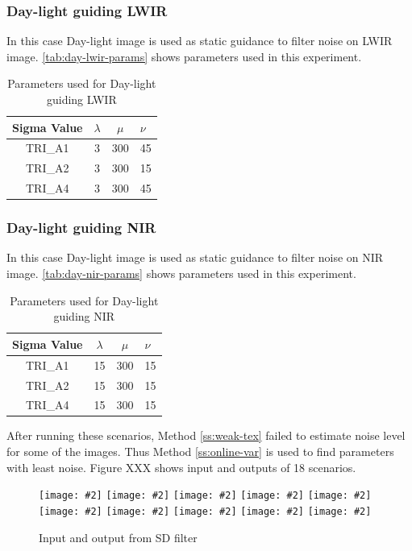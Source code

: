 \documentclass[10pt,twocolumn,letterpaper]{article}
\newcommand{\addimage}[2]{\texttt{[image: \#2]}}
\begin{document}
\subsubsection{Day-light guiding LWIR}
In this case Day-light image is used as static guidance to filter noise on LWIR image. \autoref{tab:day-lwir-params} shows parameters used in this experiment.
\begin{table}[!ht]
	\centering
	\caption{Parameters used for Day-light guiding LWIR}
	\label{tab:day-lwir-params}
	\begin{tabular}{@{}cccl@{}}
		\toprule
		\bfseries Sigma Value & \(\lambda\) & \(\mu\) & \(\nu\) \\ \midrule
		TRI\_A1               & 3        	& 300	  & 45       \\
		TRI\_A2               & 3        	& 300	  & 15       \\
		TRI\_A4               & 3        	& 300	  & 45       \\ \bottomrule
	\end{tabular}
\end{table}
\subsubsection{Day-light guiding NIR}
In this case Day-light image is used as static guidance to filter noise on NIR image. \autoref{tab:day-nir-params} shows parameters used in this experiment.
\begin{table}[!ht]
	\centering
	\caption{Parameters used for Day-light guiding NIR}
	\label{tab:day-nir-params}
	\begin{tabular}{@{}cccl@{}}
		\toprule
		\bfseries Sigma Value & \(\lambda\) & \(\mu\) & \(\nu\) \\ \midrule
		TRI\_A1               & 15        	& 300	  & 15       \\
		TRI\_A2               & 15       	& 300	  & 15       \\
		TRI\_A4               & 15       	& 300	  & 15       \\ \bottomrule
	\end{tabular}
\end{table}

After running these scenarios, Method \ref{ss:weak-tex} failed to estimate noise level for some of the images. Thus Method \ref{ss:online-var} is used to find parameters with least noise. Figure XXX shows input and outputs of 18 scenarios.
\begin{figure}
	\addimage{0.16}{images/TRI_A1/ch1.png}
	\addimage{0.16}{images/TRI_A1/ch2.png}
	\addimage{0.16}{images/TRI_A1/ch3.png}
	\addimage{0.16}{images/TRI_A2/ch1.png}	
	\addimage{0.16}{images/TRI_A2/ch2.png}
	\addimage{0.16}{images/TRI_A2/ch3.png}
	\addimage{0.16}{images/TRI_A1/ch1_ch3_15_3000_150.png}	
	\addimage{0.16}{images/TRI_A1/ch2.png}
	\addimage{0.16}{images/TRI_A1/ch1.png}
	\addimage{0.16}{images/TRI_A1/ch2_ch1_15_3000_150.png}
	\caption{Input and output from SD filter}\label{fig:example-input-output}
\end{figure}
\end{document}
